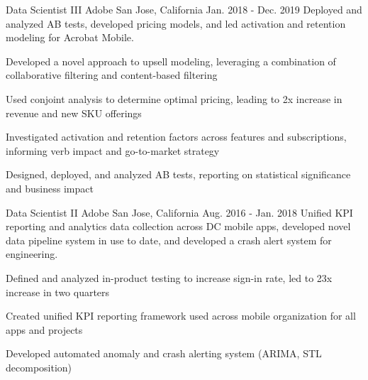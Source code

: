 \begin{cventries}
\cventry
    {Data Scientist III} %
    {Adobe} %
    {San Jose, California} %
    {Jan. 2018 - Dec. 2019} %
    {Deployed and analyzed AB tests, developed pricing models, and led activation and retention modeling for Acrobat Mobile.} %
    {
      \begin{cvitems} %
        \item {Developed a novel approach to upsell modeling, leveraging a combination of collaborative filtering and content-based filtering}
        \item {Used conjoint analysis to determine optimal pricing, leading to 2x increase in revenue and new SKU offerings}
        \item {Investigated activation and retention factors across features and subscriptions, informing verb impact and go-to-market strategy}
        \item {Designed, deployed, and analyzed AB tests, reporting on statistical significance and business impact}
      \end{cvitems}
    }

\cventry
    {Data Scientist II} %
    {Adobe} %
    {San Jose, California} %
    {Aug. 2016 - Jan. 2018} %
    {Unified KPI reporting and analytics data collection across DC mobile apps, developed novel data pipeline system in use to date, and developed a crash alert system for engineering.} %
    {
      \begin{cvitems} %
        \item {Defined and analyzed in-product testing to increase sign-in rate, led to 23x increase in two quarters}
        \item {Created unified KPI reporting framework used across mobile organization for all apps and projects}
        \item {Developed automated anomaly and crash alerting system (ARIMA, STL decomposition)}
      \end{cvitems}
    }

\end{cventries}
